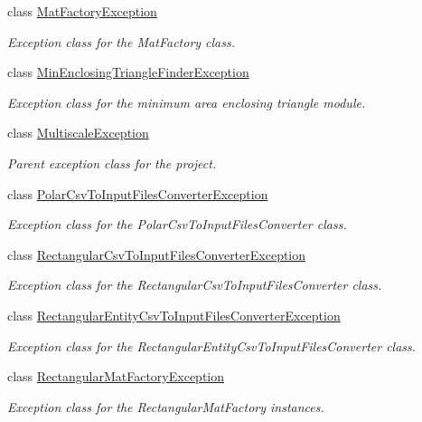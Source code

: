 \begin{DoxyCompactItemize}
class \hyperlink{classmultiscale_1_1MatFactoryException}{Mat\-Factory\-Exception}
\begin{DoxyCompactList}\small\item\em Exception class for the Mat\-Factory class. \end{DoxyCompactList}\item 
class \hyperlink{classmultiscale_1_1MinEnclosingTriangleFinderException}{Min\-Enclosing\-Triangle\-Finder\-Exception}
\begin{DoxyCompactList}\small\item\em Exception class for the minimum area enclosing triangle module. \end{DoxyCompactList}\item 
class \hyperlink{classmultiscale_1_1MultiscaleException}{Multiscale\-Exception}
\begin{DoxyCompactList}\small\item\em Parent exception class for the project. \end{DoxyCompactList}\item 
class \hyperlink{classmultiscale_1_1PolarCsvToInputFilesConverterException}{Polar\-Csv\-To\-Input\-Files\-Converter\-Exception}
\begin{DoxyCompactList}\small\item\em Exception class for the Polar\-Csv\-To\-Input\-Files\-Converter class. \end{DoxyCompactList}\item 
class \hyperlink{classmultiscale_1_1RectangularCsvToInputFilesConverterException}{Rectangular\-Csv\-To\-Input\-Files\-Converter\-Exception}
\begin{DoxyCompactList}\small\item\em Exception class for the Rectangular\-Csv\-To\-Input\-Files\-Converter class. \end{DoxyCompactList}\item 
class \hyperlink{classmultiscale_1_1RectangularEntityCsvToInputFilesConverterException}{Rectangular\-Entity\-Csv\-To\-Input\-Files\-Converter\-Exception}
\begin{DoxyCompactList}\small\item\em Exception class for the Rectangular\-Entity\-Csv\-To\-Input\-Files\-Converter class. \end{DoxyCompactList}\item 
class \hyperlink{classmultiscale_1_1RectangularMatFactoryException}{Rectangular\-Mat\-Factory\-Exception}
\begin{DoxyCompactList}\small\item\em Exception class for the Rectangular\-Mat\-Factory instances. \end{DoxyCompactList}\item 

\end{DoxyCompactItemize}
